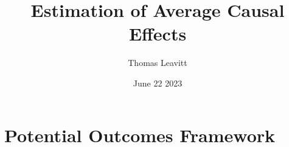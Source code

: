 \documentclass[table, xcolor = {dvipsnames}, 9pt]{beamer}
\title[]{Estimation of Average Causal Effects} %
\author{Thomas Leavitt} %
\institute[] %
{
\medskip
\textit{} %
}
\date{June 22 2023} %
\theoremstyle{plain}
\begin{document}
\begin{frame}
\titlepage %
\end{frame}


\section{Potential Outcomes Framework}
\end{document}
